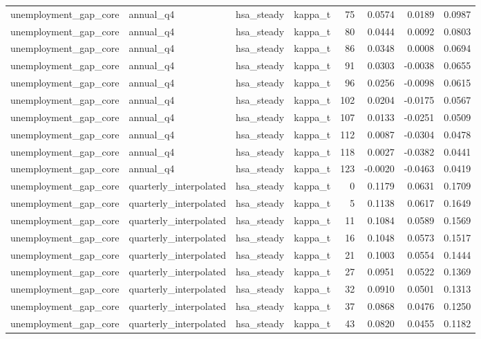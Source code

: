 \begin{tabular}{llllrrrr}
unemployment\_gap\_core & annual\_q4 & hsa\_steady & kappa\_t & 75 & 0.0574 & 0.0189 & 0.0987 \\
unemployment\_gap\_core & annual\_q4 & hsa\_steady & kappa\_t & 80 & 0.0444 & 0.0092 & 0.0803 \\
unemployment\_gap\_core & annual\_q4 & hsa\_steady & kappa\_t & 86 & 0.0348 & 0.0008 & 0.0694 \\
unemployment\_gap\_core & annual\_q4 & hsa\_steady & kappa\_t & 91 & 0.0303 & -0.0038 & 0.0655 \\
unemployment\_gap\_core & annual\_q4 & hsa\_steady & kappa\_t & 96 & 0.0256 & -0.0098 & 0.0615 \\
unemployment\_gap\_core & annual\_q4 & hsa\_steady & kappa\_t & 102 & 0.0204 & -0.0175 & 0.0567 \\
unemployment\_gap\_core & annual\_q4 & hsa\_steady & kappa\_t & 107 & 0.0133 & -0.0251 & 0.0509 \\
unemployment\_gap\_core & annual\_q4 & hsa\_steady & kappa\_t & 112 & 0.0087 & -0.0304 & 0.0478 \\
unemployment\_gap\_core & annual\_q4 & hsa\_steady & kappa\_t & 118 & 0.0027 & -0.0382 & 0.0441 \\
unemployment\_gap\_core & annual\_q4 & hsa\_steady & kappa\_t & 123 & -0.0020 & -0.0463 & 0.0419 \\
unemployment\_gap\_core & quarterly\_interpolated & hsa\_steady & kappa\_t & 0 & 0.1179 & 0.0631 & 0.1709 \\
unemployment\_gap\_core & quarterly\_interpolated & hsa\_steady & kappa\_t & 5 & 0.1138 & 0.0617 & 0.1649 \\
unemployment\_gap\_core & quarterly\_interpolated & hsa\_steady & kappa\_t & 11 & 0.1084 & 0.0589 & 0.1569 \\
unemployment\_gap\_core & quarterly\_interpolated & hsa\_steady & kappa\_t & 16 & 0.1048 & 0.0573 & 0.1517 \\
unemployment\_gap\_core & quarterly\_interpolated & hsa\_steady & kappa\_t & 21 & 0.1003 & 0.0554 & 0.1444 \\
unemployment\_gap\_core & quarterly\_interpolated & hsa\_steady & kappa\_t & 27 & 0.0951 & 0.0522 & 0.1369 \\
unemployment\_gap\_core & quarterly\_interpolated & hsa\_steady & kappa\_t & 32 & 0.0910 & 0.0501 & 0.1313 \\
unemployment\_gap\_core & quarterly\_interpolated & hsa\_steady & kappa\_t & 37 & 0.0868 & 0.0476 & 0.1250 \\
unemployment\_gap\_core & quarterly\_interpolated & hsa\_steady & kappa\_t & 43 & 0.0820 & 0.0455 & 0.1182 \\

\end{tabular}
